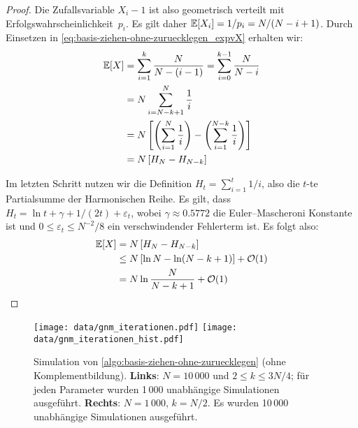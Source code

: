 \begin{proof}
    Die Zufallsvariable $X_i - 1$ ist also geometrisch verteilt mit Erfolgswahrscheinlichkeit~$p_i$.
    Es gilt daher $\mathbb{E}\!\left[X_i\right] = 1 / p_i = N / (N - i + 1)$. Durch Einsetzen in \cref{eq:basis-ziehen-ohne-zuruecklegen_expvX} erhalten wir:
    \begin{align}
        \mathbb{E}\!\left[X\right] & = \sum_{i=1}^k \frac{N}{N-(i-1)} = \sum_{i=0}^{k-1} \frac{N}{N - i}                                      \\
                 & = N \sum_{i=N-k+1}^N \frac{1}{i}                                                                         \\
                 & = N \left[ \left( \sum_{i=1}^N \frac{1}{i} \right) - \left( \sum_{i=1}^{N-k} \frac{1}{i} \right) \right] \\
                 & = N \left[ H_N - H_{N-k} \right]
    \end{align}

    Im letzten Schritt nutzen wir die Definition $H_t = \sum_{i=1}^t 1/i$, also die $t$-te Partialsumme der Harmonischen Reihe.
    Es gilt, dass $H_t = \ln t + \gamma + 1/(2t) + \varepsilon_t$, wobei $\gamma \approx 0.5772$ die Euler–Mascheroni Konstante ist und $0 \le \varepsilon_t \le N^{-2}/8$ ein verschwindender Fehlerterm ist.
    Es folgt also:
    \begin{align}
        \mathbb{E}\!\left[X\right] & = N \left[ H_N - H_{N-k} \right]                      \\
                 & \le N \left[ \ln N - \ln (N - k + 1) \right] + \mathcal{O}\!\left(1\right) \\
                 & = N \ln \frac{N}{N - k + 1} + \mathcal{O}\!\left(1\right)
    \end{align}
\end{proof}

\noindent
\begin{figure}
    \begin{center}
        \texttt{[image: data/gnm\_iterationen.pdf]}%
        \texttt{[image: data/gnm\_iterationen\_hist.pdf]}
    \end{center}
    \caption{Simulation von \cref{algo:basis-ziehen-ohne-zuruecklegen} (ohne Komplementbildung).
        \textbf{Links}: $N=10\,000$ und $2 \le k \le 3N/4$; für jeden Parameter wurden 1\,000 unabhängige Simulationen ausgeführt.
        \textbf{Rechts}: $N=1\,000$, $k = N/2$. Es wurden 10\,000 unabhängige Simulationen ausgeführt.
    }
    \label{fig:ziehen-ohne-zuruecklegen-iterationen}
\end{figure}

